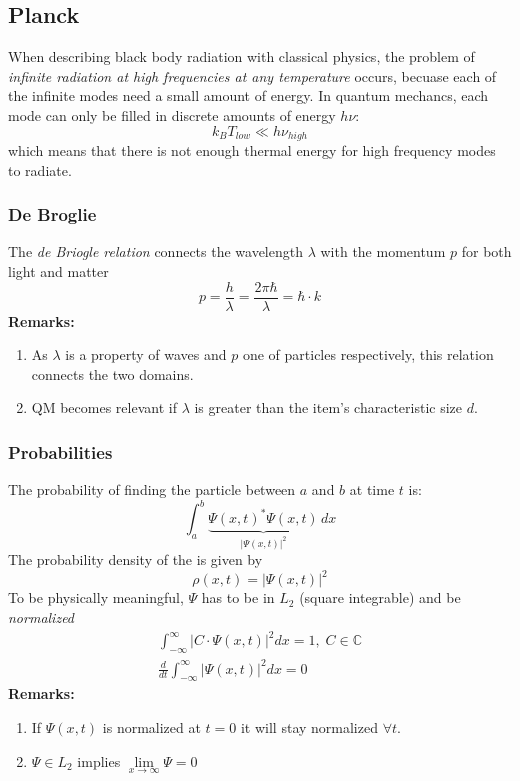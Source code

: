 \subsection{Planck}
When describing black body radiation with classical physics, the problem of \textit{infinite radiation at
    high frequencies at any temperature} occurs, becuase each of the infinite modes need a small amount of energy.
In quantum mechancs, each mode can only be filled in discrete amounts of energy $h \nu$:
\begin{equation*}
    k_B T_{low} \ll h\nu_{high}
\end{equation*}
which means that there is not enough thermal energy for high frequency modes to radiate.
\subsubsection{De Broglie}
The \textit{de Briogle relation} connects the wavelength $\lambda$ with the momentum $p$ for both light and matter
\begin{equation*}
    p=\frac{h}{\lambda}=\frac{2\pi\hbar}{\lambda}=\hbar\cdot k
\end{equation*}
\textbf{Remarks:}
\begin{enumerate}
    \item As $\lambda$ is a property of waves and $p$ one of particles respectively, this relation connects the two domains.
    \item QM becomes relevant if $\lambda$ is greater than the item's characteristic size $d$.
\end{enumerate}

\subsubsection{Probabilities}
The probability of finding the particle between $a$ and $b$ at time $t$ is:
\begin{equation*}
    \int_a^b \underbrace{{\Psi(x,t)}^*\Psi(x,t)}_{|\Psi(x,t)|^2}\,dx
\end{equation*}
The probability density of the is given by
\begin{equation*}
    \rho(x,t) = |\Psi(x,t)|^2
\end{equation*}
To be physically meaningful, $\Psi$ has to be in $L_2$ (square integrable) and be \textit{normalized}
\begin{align*}
    \int_{-\infty}^{\infty} |C\cdot \Psi(x,t)|^2 dx = 1, \; C\in\mathbb{C} \\
    \frac{d}{dt}\int_{-\infty}^{\infty} |\Psi(x,t)|^2 dx = 0
\end{align*}
\textbf{Remarks:}
\begin{enumerate}
    \item If $\Psi(x,t)$ is normalized at $t=0$ it will stay normalized $\forall t$.
    \item $\Psi \in L_2$ implies $\lim \limits_{x \to \infty}\Psi=0$
\end{enumerate}


